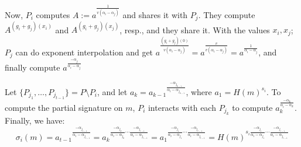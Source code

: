 Now, $P_i$ computes $A := a^{\frac{1}{v(\alpha_i - \alpha_j)}}$ and shares it with $P_j$. They compute $A^{(g_i + g_j)(x_i)}$ and $A^{(g_i + g_j)(x_j)}$, resp., and they share it. With the values $x_i, x_j$; $P_j$ can do exponent interpolation and get $ a^{\frac{(g_i + g_j)(0)}{v(\alpha_i - \alpha_j)}} = a^{\frac{v}{v(\alpha_i - \alpha_j)}} = a^{\frac{1}{\alpha_i - \alpha_j}}$, and finally compute $a^{\frac{-\alpha_j}{\alpha_i - \alpha_j}}$

Let $\{ P_{j_1}, \dots , P_{j_{t-1}} \} = P \setminus P_i$, and let $a_k =  a_{k-1} {}^{\frac{- \alpha_{j_{k-1}}}{\alpha_{i} - \alpha_{j_{k-1}}}}$, where $a_1 = H(m)^{s_i}$. To compute the partial signature on $m$, $P_i$ interacts with each $P_{j_k}$ to compute $a_k^{\frac{-\alpha_k}{\alpha_i - \alpha_k}}$. Finally, we have:
$$
\sigma_i (m)
= a_{t-1} {}^{\frac{- \alpha_{j_{t-1}}}{\alpha_{i} - \alpha_{j_{t-1}}}}
= a_k {}^{\frac{- \alpha_{j_{k}}}{\alpha_{i} - \alpha_{j_{k}}} \cdots \frac{- \alpha_{j_{t-1}}}{\alpha_{i} - \alpha_{j_{t-1}}}}
= a_1 {}^{\frac{- \alpha_{j_{1}}}{\alpha_{i} - \alpha_{j_{1}}} \cdots \frac{- \alpha_{j_{t-1}}}{\alpha_{i} - \alpha_{j_{t-1}}}}
= H(m)^{ s_i \frac{- \alpha_{j_{1}}}{\alpha_{i} - \alpha_{j_{1}}} \cdots \frac{- \alpha_{j_{t-1}}}{\alpha_{i} - \alpha_{j_{t-1}}}}
$$

